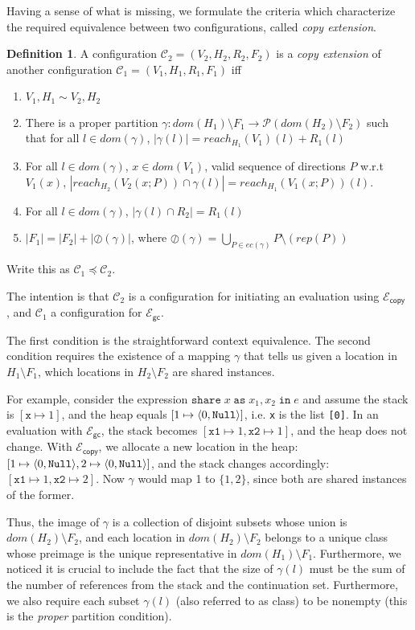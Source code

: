 \documentclass{easychair}
\newcommand{\ms}[1]{\ensuremath{\mathsf{#1}}}
\newcommand{\irl}[1]{\mathtt{#1}}
\newcommand{\sharecst}[4]{\irl{share}\;#1\;\irl{as}\;#2,#3\;\irl{in}\;#4}
\newcommand{\oh}[1]{\oslash(#1)}
\newcommand{\gcSem}{\ensuremath{\mathcal{E}_{\ms{gc}}}}
\newcommand{\copySem}{\ensuremath{\mathcal{E}_{\ms{copy}}}}
\theoremstyle{definition}
\newtheorem{definition}{Definition}
\begin{document}
Having a sense of what is missing, we formulate the
criteria which characterize the required equivalence between two configurations,
called \emph{copy extension}.
\begin{definition}
  A configuration $\mathcal{C}_2 = (V_2,H_2,R_2,F_2)$ is a \emph{copy extension} of
  another configuration
$\mathcal{C}_1 = (V_1,H_1,R_1,F_1)$ iff
\begin{enumerate}
\item $V_1,H_1 \sim V_2,H_2$
\item There is a proper partition $\gamma : dom(H_1) \setminus F_1 \to \mathcal{P}(dom(H_2) \setminus F_2)$ 
such that for all $l \in dom(\gamma)$, $|\gamma(l)| = reach_{H_1}(V_1)(l) + R_1(l)$
\item For all $l \in dom(\gamma)$, $x \in dom(V_1)$, valid sequence of directions $P$ w.r.t $V_1(x)$,
	$|reach_{H_2}(V_2(x;P)) \cap \gamma(l)| = reach_{H_1}(V_1(x;P))(l)$.
\item	For all $l \in dom(\gamma)$, $|\gamma(l) \cap R_2| = R_1(l)$
\item $|F_1| = |F_2| + |\oh{\gamma}|$, where 
	$\oh{\gamma} = \bigcup_{P \in ec(\gamma)} P \setminus (rep(P))$
\end{enumerate}
Write this as $\mathcal{C}_1 \preceq \mathcal{C}_2$.
\end{definition} 

The intention is that $\mathcal{C}_2$ is a configuration for initiating an evaluation using \copySem
, and $\mathcal{C}_1$ a configuration for \gcSem. 


The first condition is the straightforward context equivalence.
The second condition requires the existence of 
a mapping $\gamma$ that tells us given a location in $H_1 \setminus F_1$, which locations in 
$H_2 \setminus F_2$ are shared instances.

For example, consider the expression $\sharecst{x}{x_1}{x_2}{e}$ and
assume the stack is $[\texttt{x} \mapsto 1]$, and the heap equals 
$[1 \mapsto \pairexcst{0}{\irl{Null}}]$, i.e. \texttt{x} is the list \texttt{[0]}.
In an evaluation with \gcSem{}, the stack becomes 
$[\texttt{x1} \mapsto 1,\texttt{x2} \mapsto 1]$, and the heap does not change. With 
\copySem, we allocate a new location in the heap:
$[1 \mapsto \pairexcst{0}{\irl{Null}},2 \mapsto \pairexcst{0}{\irl{Null}}]$, and the 
stack changes accordingly: $[\texttt{x1} \mapsto 1,\texttt{x2} \mapsto 2]$.
Now $\gamma$ would map 1 to $\{1,2\}$, since both are shared instances of the former.

Thus, the image of $\gamma$ is a collection of disjoint subsets whose union is $dom(H_2) \setminus F_2$,
and each location in $dom(H_2) \setminus F_2$ belongs to a unique class whose preimage is the  
unique representative in $dom(H_1) \setminus F_1$. Furthermore, we noticed it is crucial to include the 
fact that the size of $\gamma(l)$ must be the sum of the number of references from the stack and 
the continuation set. Furthermore, we also require each subset $\gamma(l)$ (also referred to as class)
to be nonempty (this is the \emph{proper} partition condition).
\end{document}
